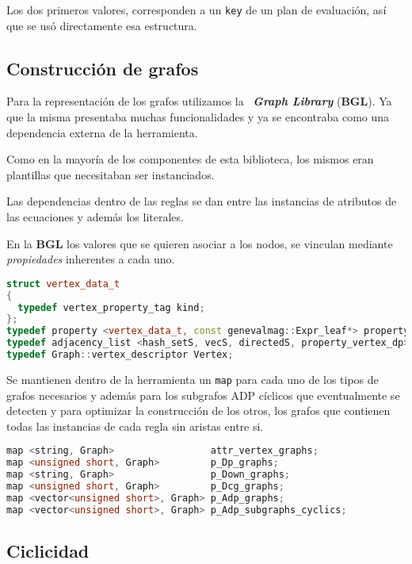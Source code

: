 Los dos primeros valores, corresponden a un \texttt{key} de un plan de evaluación, así que se usó directamente esa estructura.

\subsection{Construcción de grafos}

Para la representación de los grafos utilizamos la \boost\ \textit{\textbf{Graph Library}} (\textbf{BGL}). Ya que la misma presentaba muchas funcionalidades y ya se encontraba como una dependencia externa de la herramienta.

Como en la mayoría de los componentes de esta biblioteca, los mismos eran plantillas que necesitaban ser instanciados.

Las dependencias dentro de las reglas se dan entre las instancias de atributos de las ecuaciones y además los literales.

En la \textbf{BGL} los valores que se quieren asociar a los nodos, se vinculan mediante \textit{propiedades} inherentes a cada uno.

\begin{lstlisting}[language=C++, basicstyle=\scriptsize, columns=fullflexible, linewidth=13cm]
struct vertex_data_t
{
  typedef vertex_property_tag kind;
};
typedef property <vertex_data_t, const genevalmag::Expr_leaf*> property_vertex_dp;
typedef adjacency_list <hash_setS, vecS, directedS, property_vertex_dp> Graph;
typedef Graph::vertex_descriptor Vertex;
\end{lstlisting}

Se mantienen dentro de la herramienta un \texttt{map} para cada uno de los tipos de grafos necesarios y además para los subgrafos ADP cíclicos que eventualmente se detecten y para optimizar la construcción de los otros, los grafos que contienen todas las instancias de cada regla sin aristas entre si.

\begin{lstlisting}[language=C++, basicstyle=\scriptsize, linewidth=11.5cm]
map <string, Graph>                 attr_vertex_graphs;
map <unsigned short, Graph>         p_Dp_graphs;
map <string, Graph>                 p_Down_graphs;
map <unsigned short, Graph>         p_Dcg_graphs;
map <vector<unsigned short>, Graph> p_Adp_graphs;
map <vector<unsigned short>, Graph> p_Adp_subgraphs_cyclics;
\end{lstlisting}

\subsection*{Ciclicidad}

